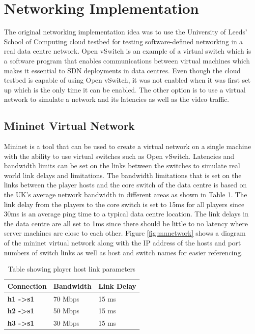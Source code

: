 \section{Networking Implementation}
The original networking implementation idea was to use the University of Leeds' School of Computing cloud testbed for testing software-defined networking in a real data centre network. Open vSwitch is an example of a virtual switch which is a software program that enables communications between virtual machines \cite{openvswitch} which makes it essential to SDN deployments in data centres. Even though the cloud testbed is capable of using Open vSwitch, it was not enabled when it was first set up which is the only time it can be enabled. The other option is to use a virtual network to simulate a network and its latencies as well as the video traffic.

\subsection{Mininet Virtual Network}
Mininet is a tool that can be used to create a virtual network on a single machine with the ability to use virtual switches such as Open vSwitch. Latencies and bandwidth limits can be set on the links between the switches to simulate real world link delays and limitations. The bandwidth limitations that is set on the links between the player hosts and the core switch of the data centre is based on the UK's average network bandwidth in different areas \cite{avgbandwidth} as shown in Table \ref{table:links}. The link delay from the players to the core switch is set to 15ms for all players since 30ms is an average ping time to a typical data centre location. The link delays in the data centre are all set to 1ms since there should be little to no latency where server machines are close to each other. Figure \ref{fig:mnnetwork} shows a diagram of the mininet virtual network along with the IP address of the hosts and port numbers of switch links as well as host and switch names for easier referencing.

\begin{table}[h!]
\centering
\begin{tabular}{|l|l|l|}
\hline
\multicolumn{1}{|c|}{\textbf{Connection}} & \multicolumn{1}{c|}{\textbf{Bandwidth}} & \multicolumn{1}{c|}{\textbf{Link Delay}} \\ \hline
\textbf{h1 -\textgreater s1}             & 70 Mbps                                 & 15 ms                                    \\ \hline
\textbf{h2 -\textgreater s1}              & 50 Mbps                                 & 15 ms                                    \\ \hline
\textbf{h3 -\textgreater s1}              & 30 Mbps                                 & 15 ms                                    \\ \hline
\end{tabular}
\caption{Table showing player host link parameters}
\label{table:links}
\end{table}


